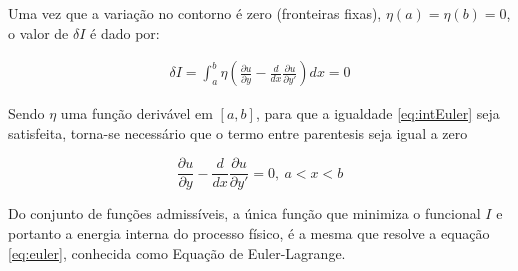 Uma vez que a variação no contorno é zero (fronteiras fixas), $\eta(a) = \eta(b) = 0$, o valor de $ \delta I $ é dado por:

\begin{equation}
\label{eq:intEuler}
\begin{split}
\delta I = \int_{a}^{b} \eta \left(\frac{\partial u}{\partial y} - \frac{d}{dx} 
\frac{\partial u}{\partial y'}\right)  dx = 0
\end{split}
\end{equation}

Sendo $ \eta $ uma função derivável em $ [a,b] $, para que a igualdade \ref{eq:intEuler} seja satisfeita, torna-se necessário que o termo entre parentesis seja igual a zero

\begin{equation}
\label{eq:euler}
\frac{\partial u}{\partial y} - \frac{d}{dx} 
\frac{\partial u}{\partial y'} = 0, \ a < x < b
\end{equation}

Do conjunto de funções admissíveis, a única função que minimiza o funcional $I$  e portanto a energia interna do processo físico, é a mesma que resolve a equação \ref{eq:euler}, conhecida como Equação de Euler-Lagrange.
